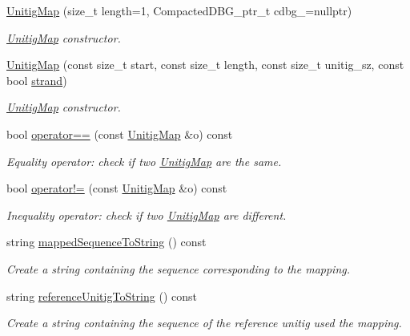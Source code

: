 \begin{DoxyCompactItemize}
\item 
\hyperlink{classUnitigMap_a43574c45ceb02111d2bc959e6ed4e717}{Unitig\+Map} (size\+\_\+t length=1, Compacted\+D\+B\+G\+\_\+ptr\+\_\+t cdbg\+\_\+=nullptr)
\begin{DoxyCompactList}\small\item\em \hyperlink{classUnitigMap}{Unitig\+Map} constructor. \end{DoxyCompactList}\item 
\hyperlink{classUnitigMap_a4f632adfd48f44d685c6a311a4197a91}{Unitig\+Map} (const size\+\_\+t start, const size\+\_\+t length, const size\+\_\+t unitig\+\_\+sz, const bool \hyperlink{structUnitigMapBase_a6de6f4a1ccef220e84d097bc3ef0fb3f}{strand})
\begin{DoxyCompactList}\small\item\em \hyperlink{classUnitigMap}{Unitig\+Map} constructor. \end{DoxyCompactList}\item 
bool \hyperlink{classUnitigMap_a73899498315ff5533c25b1c0fb1ca413}{operator==} (const \hyperlink{classUnitigMap}{Unitig\+Map} \&o) const
\begin{DoxyCompactList}\small\item\em Equality operator\+: check if two \hyperlink{classUnitigMap}{Unitig\+Map} are the same. \end{DoxyCompactList}\item 
bool \hyperlink{classUnitigMap_a777e853a143be31ff69dd9f54f33d426}{operator!=} (const \hyperlink{classUnitigMap}{Unitig\+Map} \&o) const
\begin{DoxyCompactList}\small\item\em Inequality operator\+: check if two \hyperlink{classUnitigMap}{Unitig\+Map} are different. \end{DoxyCompactList}\item 
string \hyperlink{classUnitigMap_a8a90644ef5f8d4326af8ad2f6438e1dd}{mapped\+Sequence\+To\+String} () const
\begin{DoxyCompactList}\small\item\em Create a string containing the sequence corresponding to the mapping. \end{DoxyCompactList}\item 
string \hyperlink{classUnitigMap_a90ab8fbec322df04053b9998c68d2070}{reference\+Unitig\+To\+String} () const
\begin{DoxyCompactList}\small\item\em Create a string containing the sequence of the reference unitig used the mapping. \end{DoxyCompactList}\item 

\end{DoxyCompactItemize}

